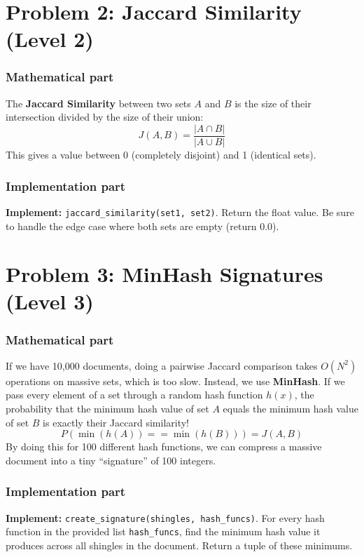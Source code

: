 \documentclass[11pt]{article}
\begin{document}
\section*{Problem 2: Jaccard Similarity (Level 2)}

\subsubsection*{Mathematical part}
The \textbf{Jaccard Similarity} between two sets $A$ and $B$ is the size of their intersection divided by the size of their union:
$$ J(A, B) = \frac{|A \cap B|}{|A \cup B|} $$
This gives a value between 0 (completely disjoint) and 1 (identical sets).

\subsubsection*{Implementation part}
\textbf{Implement:} \lstinline|jaccard_similarity(set1, set2)|. Return the float value. Be sure to handle the edge case where both sets are empty (return 0.0).


\section*{Problem 3: MinHash Signatures (Level 3)}

\subsubsection*{Mathematical part}
If we have 10,000 documents, doing a pairwise Jaccard comparison takes $O(N^2)$ operations on massive sets, which is too slow.
Instead, we use \textbf{MinHash}. If we pass every element of a set through a random hash function $h(x)$, the probability that the minimum hash value of set $A$ equals the minimum hash value of set $B$ is exactly their Jaccard similarity!
$$ P(\min(h(A)) == \min(h(B))) = J(A, B) $$
By doing this for 100 different hash functions, we can compress a massive document into a tiny ``signature'' of 100 integers.

\subsubsection*{Implementation part}
\textbf{Implement:} \lstinline|create_signature(shingles, hash_funcs)|.
For every hash function in the provided list \lstinline|hash_funcs|, find the minimum hash value it produces across all shingles in the document. Return a tuple of these minimums.
\end{document}
